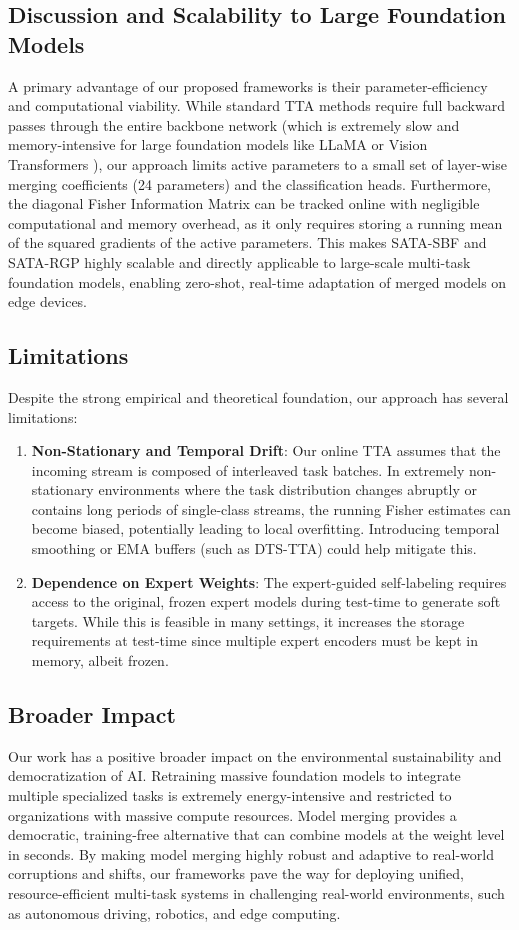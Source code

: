 \documentclass{article}
\begin{document}
\subsection{Discussion and Scalability to Large Foundation Models}
A primary advantage of our proposed frameworks is their parameter-efficiency and computational viability. While standard TTA methods require full backward passes through the entire backbone network (which is extremely slow and memory-intensive for large foundation models like LLaMA \cite{touvron23llama} or Vision Transformers \cite{dosovitskiy21vit}), our approach limits active parameters to a small set of layer-wise merging coefficients (24 parameters) and the classification heads. Furthermore, the diagonal Fisher Information Matrix can be tracked online with negligible computational and memory overhead, as it only requires storing a running mean of the squared gradients of the active parameters. This makes SATA-SBF and SATA-RGP highly scalable and directly applicable to large-scale multi-task foundation models, enabling zero-shot, real-time adaptation of merged models on edge devices.

\subsection{Limitations}
Despite the strong empirical and theoretical foundation, our approach has several limitations:
\begin{enumerate}
    \item \textbf{Non-Stationary and Temporal Drift}: Our online TTA assumes that the incoming stream is composed of interleaved task batches. In extremely non-stationary environments where the task distribution changes abruptly or contains long periods of single-class streams, the running Fisher estimates can become biased, potentially leading to local overfitting. Introducing temporal smoothing or EMA buffers (such as DTS-TTA) could help mitigate this.
    \item \textbf{Dependence on Expert Weights}: The expert-guided self-labeling requires access to the original, frozen expert models during test-time to generate soft targets. While this is feasible in many settings, it increases the storage requirements at test-time since multiple expert encoders must be kept in memory, albeit frozen.
\end{enumerate}

\subsection{Broader Impact}
Our work has a positive broader impact on the environmental sustainability and democratization of AI. Retraining massive foundation models to integrate multiple specialized tasks is extremely energy-intensive and restricted to organizations with massive compute resources. Model merging provides a democratic, training-free alternative that can combine models at the weight level in seconds. By making model merging highly robust and adaptive to real-world corruptions and shifts, our frameworks pave the way for deploying unified, resource-efficient multi-task systems in challenging real-world environments, such as autonomous driving, robotics, and edge computing.
\end{document}
